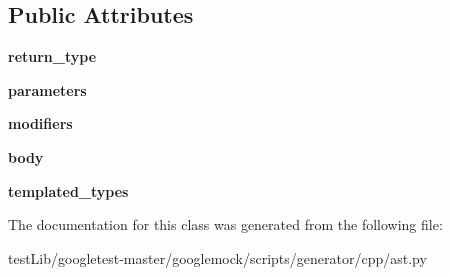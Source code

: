 \subsection*{Public Attributes}
\begin{DoxyCompactItemize}
\item 
\mbox{\label{classcpp_1_1ast_1_1Function_af750fd788d7ab33163ee066534780212}} 
{\bfseries return\+\_\+type}
\item 
\mbox{\label{classcpp_1_1ast_1_1Function_a0e61ef47af9cf2fd4402dbd8cab631ef}} 
{\bfseries parameters}
\item 
\mbox{\label{classcpp_1_1ast_1_1Function_ad30eed435f1ff9ff34ade9cc0d7be121}} 
{\bfseries modifiers}
\item 
\mbox{\label{classcpp_1_1ast_1_1Function_a8e25e5016b23b38e32acf2df529c0650}} 
{\bfseries body}
\item 
\mbox{\label{classcpp_1_1ast_1_1Function_a57bb03218bade3240137a0d91c467cb6}} 
{\bfseries templated\+\_\+types}
\end{DoxyCompactItemize}


The documentation for this class was generated from the following file\+:\begin{DoxyCompactItemize}
\item 
test\+Lib/googletest-\/master/googlemock/scripts/generator/cpp/ast.\+py\end{DoxyCompactItemize}
